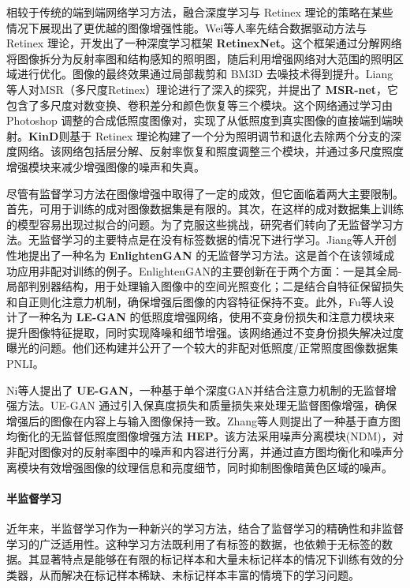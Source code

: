 \documentclass[a4paper]{ctexart}
\begin{document}
	相较于传统的端到端网络学习方法，融合深度学习与 Retinex 理论的策略在某些情况下展现出了更优越的图像增强性能。Wei等人\cite{wei2018deep}率先结合数据驱动方法与 Retinex 理论，开发出了一种深度学习框架 \textbf{RetinexNet}。这个框架通过分解网络将图像拆分为反射率图和结构感知的照明图，随后利用增强网络对大范围的照明区域进行优化。图像的最终效果通过局部裁剪和 BM3D 去噪技术得到提升。Liang等人\cite{shen2017msr}对MSR（多尺度Retinex）理论进行了深入的探究，并提出了 \textbf{MSR-net}，它包含了多尺度对数变换、卷积差分和颜色恢复等三个模块。这个网络通过学习由 Photoshop 调整的合成低照度图像对，实现了从低照度到真实图像的直接端到端映射。\textbf{KinD}\cite{zhang2019kindling}则基于 Retinex 理论构建了一个分为照明调节和退化去除两个分支的深度网络。该网络包括层分解、反射率恢复和照度调整三个模块，并通过多尺度照度增强模块来减少增强图像的噪声和失真。
	
	尽管有监督学习方法在图像增强中取得了一定的成效，但它面临着两大主要限制。首先，可用于训练的成对图像数据集是有限的。其次，在这样的成对数据集上训练的模型容易出现过拟合的问题。为了克服这些挑战，研究者们转向了无监督学习方法。无监督学习的主要特点是在没有标签数据的情况下进行学习。Jiang等人\cite{jiang2021enlightengan}开创性地提出了一种名为 \textbf{EnlightenGAN} 的无监督学习方法。这是首个在该领域成功应用非配对训练的例子。EnlightenGAN的主要创新在于两个方面：一是其全局-局部判别器结构，用于处理输入图像中的空间光照变化；二是结合自特征保留损失和自正则化注意力机制，确保增强后图像的内容特征保持不变。此外，Fu等人\cite{fu2022gan}设计了一种名为 \textbf{LE-GAN} 的低照度增强网络，使用不变身份损失和注意力模块来提升图像特征提取，同时实现降噪和细节增强。该网络通过不变身份损失解决过度曝光的问题。他们还构建并公开了一个较大的非配对低照度/正常照度图像数据集PNLI。
	
	Ni等人\cite{ni2020towards}提出了 \textbf{UE-GAN}，一种基于单个深度GAN并结合注意力机制的无监督增强方法。UE-GAN 通过引入保真度损失和质量损失来处理无监督图像增强，确保增强后的图像在内容上与输入图像保持一致。Zhang等人\cite{zhang2021unsupervised}则提出了一种基于直方图均衡化的无监督低照度图像增强方法 \textbf{HEP}。该方法采用噪声分离模块(NDM)，对非配对图像对的反射率图中的噪声和内容进行分离，并通过直方图均衡化和噪声分离模块有效增强图像的纹理信息和亮度细节，同时抑制图像暗黄色区域的噪声。
	
	\paragraph{半监督学习}
	
	近年来，半监督学习作为一种新兴的学习方法，结合了监督学习的精确性和非监督学习的广泛适用性。这种学习方法既利用了有标签的数据，也依赖于无标签的数据。其显著特点是能够在有限的标记样本和大量未标记样本的情况下训练有效的分类器，从而解决在标记样本稀缺、未标记样本丰富的情境下的学习问题。
	
\end{document}

